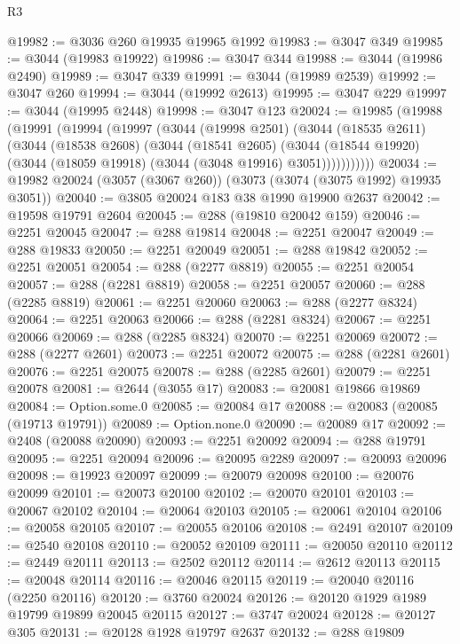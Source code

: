 \begin{lexlean}{R3}
\begin{coremodule}
@19982 := @3036 @260 @19935 @19965 @1992
@19983 := @3047 @349
@19985 := @3044 (@19983 @19922)
@19986 := @3047 @344
@19988 := @3044 (@19986 @2490)
@19989 := @3047 @339
@19991 := @3044 (@19989 @2539)
@19992 := @3047 @260
@19994 := @3044 (@19992 @2613)
@19995 := @3047 @229
@19997 := @3044 (@19995 @2448)
@19998 := @3047 @123
@20024 := @19985
    (@19988
      (@19991
        (@19994
          (@19997
            (@3044
              (@19998 @2501)
              (@3044
                (@18535 @2611)
                (@3044
                  (@18538 @2608)
                  (@3044
                    (@18541 @2605)
                    (@3044
                      (@18544 @19920)
                      (@3044 (@18059 @19918) (@3044 (@3048 @19916) @3051)))))))))))
@20034 := @19982 @20024 (@3057 (@3067 @260)) (@3073 (@3074 (@3075 @1992) @19935 @3051))
@20040 := @3805 @20024 @183 @38 @1990 @19900 @2637
@20042 := @19598 @19791 @2604
@20045 := @288 (@19810 @20042 @159)
@20046 := @2251 @20045
@20047 := @288 @19814
@20048 := @2251 @20047
@20049 := @288 @19833
@20050 := @2251 @20049
@20051 := @288 @19842
@20052 := @2251 @20051
@20054 := @288 (@2277 @8819)
@20055 := @2251 @20054
@20057 := @288 (@2281 @8819)
@20058 := @2251 @20057
@20060 := @288 (@2285 @8819)
@20061 := @2251 @20060
@20063 := @288 (@2277 @8324)
@20064 := @2251 @20063
@20066 := @288 (@2281 @8324)
@20067 := @2251 @20066
@20069 := @288 (@2285 @8324)
@20070 := @2251 @20069
@20072 := @288 (@2277 @2601)
@20073 := @2251 @20072
@20075 := @288 (@2281 @2601)
@20076 := @2251 @20075
@20078 := @288 (@2285 @2601)
@20079 := @2251 @20078
@20081 := @2644 (@3055 @17)
@20083 := @20081 @19866 @19869
@20084 := Option.some.{0}
@20085 := @20084 @17
@20088 := @20083 (@20085 (@19713 @19791))
@20089 := Option.none.{0}
@20090 := @20089 @17
@20092 := @2408 (@20088 @20090)
@20093 := @2251 @20092
@20094 := @288 @19791
@20095 := @2251 @20094
@20096 := @20095 @2289
@20097 := @20093 @20096
@20098 := @19923 @20097
@20099 := @20079 @20098
@20100 := @20076 @20099
@20101 := @20073 @20100
@20102 := @20070 @20101
@20103 := @20067 @20102
@20104 := @20064 @20103
@20105 := @20061 @20104
@20106 := @20058 @20105
@20107 := @20055 @20106
@20108 := @2491 @20107
@20109 := @2540 @20108
@20110 := @20052 @20109
@20111 := @20050 @20110
@20112 := @2449 @20111
@20113 := @2502 @20112
@20114 := @2612 @20113
@20115 := @20048 @20114
@20116 := @20046 @20115
@20119 := @20040 @20116 (@2250 @20116)
@20120 := @3760 @20024
@20126 := @20120 @1929 @1989 @19799 @19899 @20045 @20115
@20127 := @3747 @20024
@20128 := @20127 @305
@20131 := @20128 @1928 @19797 @2637
@20132 := @288 @19809

\end{coremodule}
\end{lexlean}
